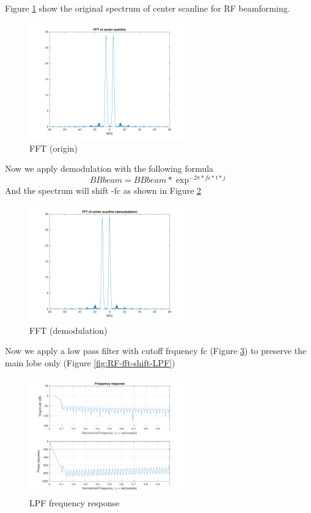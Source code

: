 \documentclass{article}
\begin{document}
Figure \ref{fig:RF-fft-origin} show the original spectrum of center scanline for RF beamforming.
\begin{figure}[H]
    \centering
    \includegraphics[width=0.6\textwidth]{src/RF/b-4.pdf}
    \caption{FFT (origin)}
    \label{fig:RF-fft-origin}
\end{figure}
Now we apply demodulation with the following formula
$$
    BBbeam = BBbeam * \exp^{-2 \pi * fc * t * j}
$$
And the spectrum will shift -fc as shown in Figure \ref{fig:RF-fft-shift}
\begin{figure}[H]
    \centering
    \includegraphics[width=0.6\textwidth]{src/RF/b-5.pdf}
    \caption{FFT (demodulation)}
    \label{fig:RF-fft-shift}
\end{figure}
Now we apply a low pass filter with cutoff frquency fc (Figure \ref{fig:RF-LPF}) to preserve the main lobe only 
(Figure \ref{fig:RF-fft-shift-LPF})
\begin{figure}[H]
    \centering
    \includegraphics[width=0.6\textwidth]{src/RF/b-6.pdf}
    \caption{LPF frequency response}
    \label{fig:RF-LPF}
\end{figure}
\end{document}
